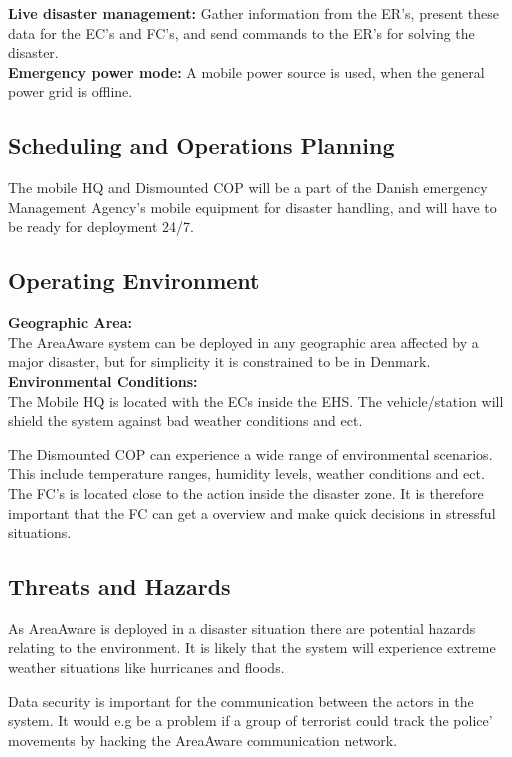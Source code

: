 \noindent \textbf{Live disaster management:} Gather information from the ER's, present these data for the EC's and FC's, and send commands to the ER's for solving the disaster.\\

\noindent \textbf{Emergency power mode:} A mobile power source is used, when the general power grid is offline.

\subsection{Scheduling and Operations Planning}
The mobile HQ and Dismounted COP will be a part of the Danish emergency Management Agency’s mobile equipment for disaster handling, and will have to be ready for deployment 24/7.

\subsection{Operating Environment}
\noindent \textbf{Geographic Area:}\\
The AreaAware system can be deployed in any geographic area affected by a major disaster, but for simplicity it is constrained to be in Denmark. \\

\noindent \textbf{Environmental Conditions:}\\
The Mobile HQ is located with the ECs inside the EHS. The vehicle/station will shield the system against bad weather conditions and ect.

The Dismounted COP can experience a wide range of environmental scenarios. This include temperature ranges, humidity levels, weather conditions and ect. The FC's is located close to the action inside the disaster zone. It is therefore important that the FC can get a overview and make quick decisions in stressful situations.

\subsection{Threats and Hazards}
As AreaAware is deployed in a disaster situation there are potential hazards relating to the environment. It is likely that the system will experience extreme weather situations like hurricanes and floods.

Data security is important for the communication between the actors in the system. It would e.g be a problem if a group of terrorist could track the police’ movements by hacking the AreaAware communication network.

